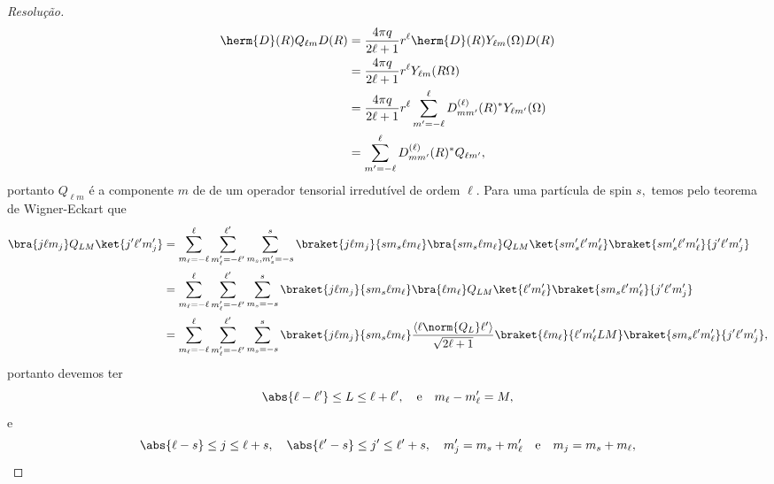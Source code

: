 \begin{proof}[Resolução]
   \begin{align*}
      \herm{D}(R) Q_{\ell m} D(R) &= \frac{4\pi q}{2\ell + 1} r^{\ell} \herm{D}(R) Y_{\ell m}(\Omega) D(R)\\
                                  &= \frac{4\pi q}{2\ell + 1} r^\ell Y_{\ell m}(R \Omega)\\
                                  &= \frac{4\pi q}{2\ell + 1} r^\ell \sum_{m' = -\ell}^{\ell} D^{(\ell)}_{mm'}(R)^* Y_{\ell m'}(\Omega)\\
                                  &= \sum_{m' = -\ell}^{\ell} D^{(\ell)}_{mm'}(R)^* Q_{\ell m'},
   \end{align*}
   portanto \(Q_{\ell m}\) é a componente \(m\) de de um operador tensorial irredutível de ordem \(\ell.\) Para uma partícula de spin \(s,\) temos pelo teorema de Wigner-Eckart que
   \begin{align*}
      \bra{j \ell m_j} Q_{LM} \ket{j' \ell' m_j'} &= \sum_{m_\ell = - \ell}^{\ell} \sum_{m_\ell' = - \ell'}^{\ell'}\sum_{m_s,m_s' = - s}^{s} \braket{j\ell m_j}{s m_s \ell m_\ell}\bra{s m_s \ell m_\ell} Q_{LM}\ket{sm_s' \ell' m_\ell'}\braket{sm_s' \ell' m_\ell'}{j'\ell'm_j'}\\
                                                  &= \sum_{m_\ell = - \ell}^{\ell} \sum_{m_\ell' = - \ell'}^{\ell'}\sum_{m_s= - s}^{s} \braket{j\ell m_j}{s m_s \ell m_\ell}\bra{\ell m_\ell} Q_{LM}\ket{\ell' m_\ell'}\braket{sm_s \ell' m_\ell'}{j'\ell'm_j'}\\
                                                  &= \sum_{m_\ell = - \ell}^{\ell} \sum_{m_\ell' = - \ell'}^{\ell'}\sum_{m_s= - s}^{s} \braket{j\ell m_j}{s m_s \ell m_\ell}\frac{\langle \ell \norm{Q_{L}} \ell'\rangle}{\sqrt{2 \ell + 1}} \braket{\ell m_\ell}{\ell' m_{\ell}' L M} \braket{sm_s \ell' m_\ell'}{j'\ell'm_j'},
   \end{align*}
   portanto devemos ter
   \begin{equation*}
      \abs{\ell - \ell'} \leq L \leq \ell + \ell',\quad\text{e}\quad m_\ell - m_\ell' = M,
   \end{equation*}
   e
   \begin{equation*}
      \abs{\ell - s} \leq j \leq \ell + s,\quad\abs{\ell' - s} \leq j' \leq \ell' + s,\quad m_j' = m_s + m_\ell'\quad\text{e}\quad m_j = m_s + m_\ell,

\end{equation*}
\end{proof}
